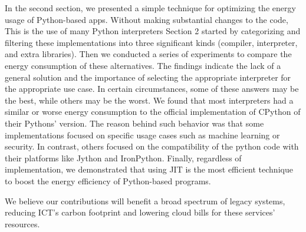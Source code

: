 In the second section, we presented a simple technique for optimizing the energy usage of Python-based apps. Without making substantial changes to the code, This is the use of many Python interpreters
Section 2 started by categorizing and filtering these implementations into three significant kinds (compiler, interpreter, and extra libraries).
Then we conducted a series of experiments to compare the energy consumption of these alternatives.
The findings indicate the lack of a general solution and the importance of selecting the appropriate interpreter for the appropriate use case. In certain circumstances, some of these answers may be the best, while others may be the worst.
We found that most interpreters had a similar or worse energy consumption to the official implementation of CPython of their Pythons' version. The reason behind such behavior was that some implementations focused on specific usage cases such as machine learning or security. In contrast, others focused on the compatibility of the python code with their platforms like Jython and IronPython.
Finally, regardless of implementation, we demonstrated that using JIT is the most efficient technique to boost the energy efficiency of Python-based programs.

We believe our contributions will benefit a broad spectrum of legacy systems, reducing ICT's carbon footprint and lowering cloud bills for these services' resources.